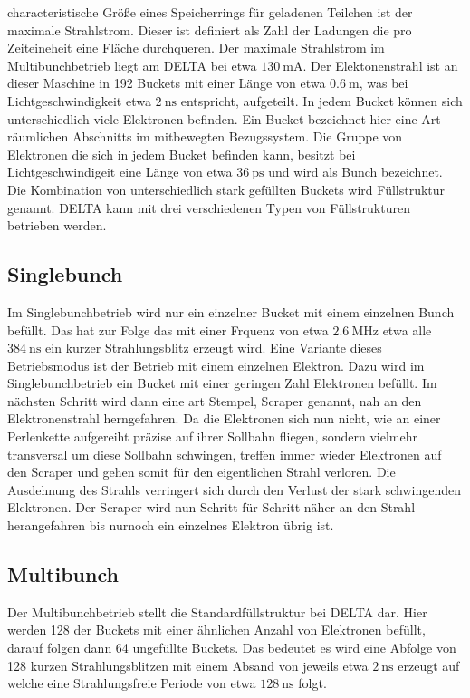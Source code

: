 characteristische Größe eines Speicherrings für geladenen Teilchen ist der maximale Strahlstrom. Dieser 
ist definiert als Zahl der Ladungen die pro Zeiteineheit eine Fläche durchqueren.
Der maximale Strahlstrom im Multibunchbetrieb liegt am DELTA bei etwa $\SI{130}{\milli\ampere}$.
Der Elektonenstrahl ist an dieser Maschine in 192 Buckets mit einer Länge von etwa $\SI{0,6}{\meter}$, 
was bei Lichtgeschwindigkeit etwa $\SI{2}{\nano\second}$ entspricht, aufgeteilt. In jedem Bucket können 
sich unterschiedlich viele Elektronen befinden. Ein Bucket bezeichnet hier eine Art räumlichen Abschnitts 
im mitbewegten Bezugssystem. Die Gruppe von Elektronen die sich in jedem Bucket befinden kann, besitzt 
bei Lichtgeschwindigeit eine Länge von etwa $\SI{36}{\pico\second}$ und wird als Bunch bezeichnet. Die 
Kombination von unterschiedlich stark gefüllten Buckets wird Füllstruktur genannt. DELTA kann mit drei 
verschiedenen Typen von Füllstrukturen betrieben werden.

\subsection{Singlebunch}
\label{sec:Singlebunch}
Im Singlebunchbetrieb wird nur ein einzelner Bucket mit einem einzelnen Bunch befüllt. Das hat zur Folge
das mit einer Frquenz von etwa $\SI{2,6}{\mega\hertz}$ etwa alle $\SI{384}{\nano\second}$ ein kurzer 
Strahlungsblitz erzeugt wird. Eine Variante dieses Betriebsmodus ist der Betrieb mit einem einzelnen
Elektron. Dazu wird im Singlebunchbetrieb ein Bucket mit einer geringen Zahl Elektronen befüllt. Im 
nächsten Schritt wird dann eine art Stempel, Scraper genannt, nah an den Elektronenstrahl herngefahren.
Da die Elektronen sich nun nicht, wie an einer Perlenkette aufgereiht präzise auf ihrer Sollbahn fliegen,
sondern vielmehr transversal um diese Sollbahn schwingen, treffen immer wieder Elektronen auf den Scraper
und gehen somit für den eigentlichen Strahl verloren. Die Ausdehnung des Strahls verringert sich durch den 
Verlust der stark schwingenden Elektronen. Der Scraper wird nun Schritt für Schritt näher an den Strahl 
herangefahren bis nurnoch ein einzelnes Elektron übrig ist.

\subsection{Multibunch}
\label{Multibunch}
Der Multibunchbetrieb stellt die Standardfüllstruktur bei DELTA dar. Hier werden 128 der Buckets mit 
einer ähnlichen Anzahl von Elektronen befüllt, darauf folgen dann 64 ungefüllte Buckets. Das bedeutet es 
wird eine Abfolge von 128 kurzen Strahlungsblitzen mit einem Absand von jeweils etwa 
$\SI{2}{\nano\second}$ erzeugt auf welche eine Strahlungsfreie Periode von etwa $\SI{128}{\nano\second}$
folgt.

